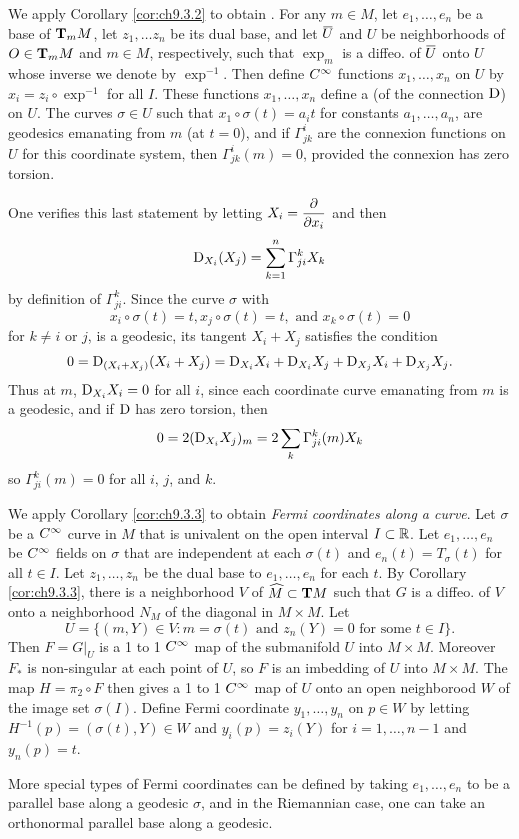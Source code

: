 \documentclass[../main]{subfiles}
\begin{document}
We apply Corollary \ref{cor:ch9.3.2} to obtain . For any $m\in M$, let $e_1,\dots, e_n$ be a base of $\tangentspace{M}{m}$, let $z_1,\dots z_n$ be its dual base, and let $\xoverline U$ and $U$ be neighborhoods of $O \in \tangentspace{M}{m}$ and $m\in M$, respectively, such that $\exp_m$ is a diffeo. of $\xoverline U$ onto $U$ whose inverse we denote by $\exp^{-1}$.  Then define $\CInfty$ functions $x_1,\dots, x_n$ on $U$ by $x_i = z_i \circ \exp^{-1}$ for all $I$. These functions $x_1,\dots, x_n$ define a  (of the connection $\D$) on $U$. The curves $\sigma \in U$ such that $x_1 \circ \sigma(t) = a_it$ for constants $a_1, \dots, a_n$, are geodesics emanating from $m$ (at $t=0$), and if $\Gamma_{jk}^i$ are the connexion functions on $U$ for this coordinate system, then $\Gamma_{jk}^i (m) = 0$, provided the connexion has zero torsion.

One verifies this last statement by letting $X_i = \pdv{}{x_i}$ and then \[\D_{X_i}(X_j) = \sum_{k=1}^n \Gamma_{ji}^k X_k\] by definition of $\Gamma_{ji}^k$. Since the curve $\sigma$ with \[x_i \circ \sigma(t) = t, x_j\circ \sigma(t) = t,\text{ and }x_k \circ \sigma(t) = 0\] for $k\ne i$ or $j$, is a geodesic, its tangent $X_i + X_j$ satisfies the condition 
\[ 0 = \D_{(X_i + X_j)}(X_i + X_j) = \D_{X_i} X_i + \D_{X_i} X_j + \D_{X_j} X_i + \D_{X_j} X_j.\]
Thus at $m$, $\D_{X_i}X_i = 0$ for all $i$, since each coordinate curve emanating from $m$ is a geodesic, and if $\D$ has zero torsion, then \[0 = 2(\D_{X_i} X_j)_m = 2\sum_k \Gamma_{ji}^k (m) X_k\] so $\Gamma_{ji}^k(m) = 0$ for all $i$, $j$, and $k$.

We apply Corollary \ref{cor:ch9.3.3} to obtain \emph{Fermi coordinates along a curve}. Let $\sigma$ be a $\CInfty$ curve in $M$ that is univalent on the open interval $I\subset\bR$. Let $e_1,\dots,e_n$ be $\CInfty$ fields on $\sigma$ that are independent at each $\sigma(t)$ and $e_n(t) = T_\sigma(t)$ for all $t \in I$. Let $z_1,\dots,z_n$ be the dual base to $e_1,\dots,e_n$ for each $t$. By Corollary \ref{cor:ch9.3.3}, there is a neighborhood $V$ of $\widehat M \subset \tangentbundle M$ such that $G$ is a diffeo. of $V$ onto a neighborhood $N_M$ of the diagonal in $M \times M$. Let
\[ U = \{ (m,Y) \in V:m=\sigma(t) \text{ and } z_n(Y) = 0 \text{ for some } t\in I \}.\]
Then $F = G|_U$ is a 1 to 1 $\CInfty$ map of the submanifold $U$ into $M\times M$. Moreover $F_\ast$ is non-singular at each point of $U$, so $F$ is an imbedding of $U$ into $M \times M$. The map $H = \pi_2 \circ F$ then gives a 1 to 1 $\CInfty$ map of $U$ onto an open neighborood $W$ of the image set $\sigma(I)$. Define Fermi coordinate $y_1,\dots,y_n$ on $p \in W$ by letting $H^{-1}(p) = (\sigma(t), Y) \in W$ and $y_i(p) = z_i(Y)$ for $i= 1,\dots, n-1$ and $y_n(p) = t$. 

More special types of Fermi coordinates can be defined by taking $e_1,\dots,e_n$ to be a parallel base along a geodesic $\sigma$, and in the Riemannian case, one can take an orthonormal parallel base along a geodesic.
\end{document}
